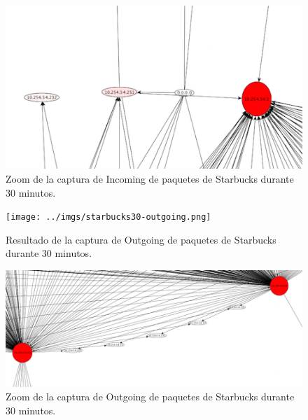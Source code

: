 \documentclass[10pt, a4paper]{article}
\begin{document}
\begin{figure}[H] %
\begin{center}
\includegraphics[width=400pt]{../imgs/zoom-starbucks-incoming2.png}
\caption{Zoom de la captura de Incoming de paquetes de Starbucks durante 30 minutos.}
\end{center}
\end{figure}


\begin{figure}[H] %
\begin{center}
\texttt{[image: ../imgs/starbucks30-outgoing.png]}
\caption{Resultado de la captura de Outgoing de paquetes de Starbucks durante 30 minutos.}
\end{center}
\end{figure}

\begin{figure}[H] %
\begin{center}
\includegraphics[width=400pt]{../imgs/zoom-starbucks-outgoing.png}
\caption{Zoom de la captura de Outgoing de paquetes de Starbucks durante 30 minutos.}
\end{center}
\end{figure}
\end{document}
